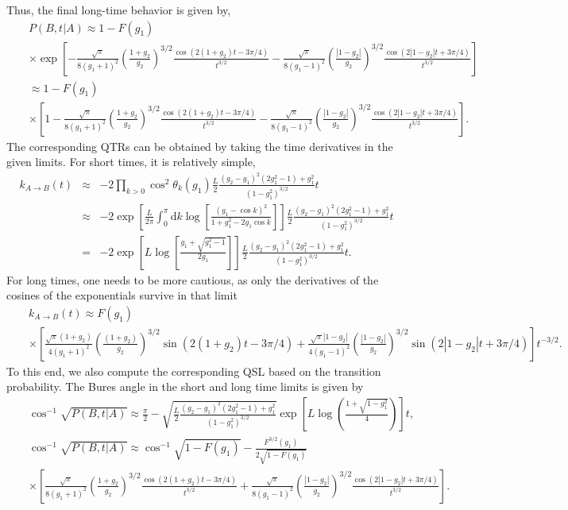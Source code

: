 \documentclass[prl,aps,amssymb,twocolumn,superscriptaddress, notitlepage, longbibliography]{revtex4-2}
\begin{document}
Thus, the final long-time behavior is given by,
\begin{eqnarray}
    &&P(B,t\vert A)\approx 1-F(g_1)\\
    &&\times\exp\left[-\frac{\sqrt\pi}{8(g_1+1)^2}\left(\frac{1+g_2}{g_2}\right)^{3/2}\frac{\cos(2(1+g_2)t-3\pi/4)}{t^{3/2}}-\frac{\sqrt\pi}{8(g_1-1)^2}\left(\frac{|1-g_2|}{g_2}\right)^{3/2}\frac{\cos(2|1-g_2|t+3\pi/4)}{t^{3/2}}\right]\nonumber\\
    &&\approx1-F(g_1)\nonumber\\
    &&\times\left[1-\frac{\sqrt\pi}{8(g_1+1)^2}\left(\frac{1+g_2}{g_2}\right)^{3/2}\frac{\cos(2(1+g_2)t-3\pi/4)}{t^{3/2}}-\frac{\sqrt\pi}{8(g_1-1)^2}\left(\frac{|1-g_2|}{g_2}\right)^{3/2}\frac{\cos(2|1-g_2|t+3\pi/4)}{t^{3/2}}\right].\nonumber
\end{eqnarray}
The corresponding QTRs can be obtained by taking the time derivatives in the given limits. For short times, it is relatively simple,
\begin{eqnarray}
    k_{A\rightarrow B}(t)&\approx&-2\prod_{k>0}\cos^2\theta_k(g_1)\frac{L}{2}\frac{(g_2-g_1)^2(2g^2_1-1)+g^2_1}{(1-g^2_1)^{3/2}}t\\
    &\approx& -2\exp\left[\frac{L}{2\pi}\int_0^\pi\mathrm dk\log\left[\frac{(g_1-\cos k)^2}{1+g^2_1-2g_1\cos k}\right]\right]\frac{L}{2}\frac{(g_2-g_1)^2(2g^2_1-1)+g^2_1}{(1-g^2_1)^{3/2}}t\nonumber\\
    &=&-2\exp\left[L\log\left[\frac{g_1+\sqrt{g^2_1-1}}{2g_1}\right]\right]\frac{L}{2}\frac{(g_2-g_1)^2(2g^2_1-1)+g^2_1}{(1-g^2_1)^{3/2}}t.\nonumber
\end{eqnarray}
For long times, one needs to be more cautious, as only the derivatives of the cosines of the exponentials survive in that limit
\begin{eqnarray}
    &&k_{A\rightarrow B}(t)\approx F(g_1)\\
    &&\times\left[\frac{\sqrt\pi(1+g_2)}{4(g_1+1)^2}\left(\frac{(1+g_2)}{g_2}\right)^{3/2}\sin(2(1+g_2)t-3\pi/4)+\frac{\sqrt\pi|1-g_2|}{4(g_1-1)^2}\left(\frac{|1-g_2|}{g_2}\right)^{3/2}\sin(2|1-g_2|t+3\pi/4)\right]t^{-3/2}.\nonumber
\end{eqnarray}
To this end, we also compute the corresponding QSL based on the transition probability. The Bures angle in the short and long time limits is given by
\begin{eqnarray}
    &&\cos^{-1}\sqrt{P(B,t\vert A)}\approx\frac{\pi}{2}-\sqrt{\frac{L}{2}\frac{(g_2-g_1)^2(2g^2_1-1)+g^2_1}{(1-g^2_1)^{3/2}}}\exp\left[L\log\left(\frac{1+\sqrt{1-g^2_1}}{4}\right)\right]t,\\
    &&\cos^{-1}\sqrt{P(B,t\vert A)}\approx \cos^{-1}\sqrt{1-F(g_1)}-\frac{F^{3/2}(g_1)}{2\sqrt{1-F(g_1)}}\\
    &&\times\left[\frac{\sqrt\pi}{8(g_1+1)^2}\left(\frac{1+g_2}{g_2}\right)^{3/2}\frac{\cos(2(1+g_2)t-3\pi/4)}{t^{3/2}}+\frac{\sqrt\pi}{8(g_1-1)^2}\left(\frac{|1-g_2|}{g_2}\right)^{3/2}\frac{\cos(2|1-g_2|t+3\pi/4)}{t^{3/2}}\right].\nonumber
\end{eqnarray}
\end{document}
